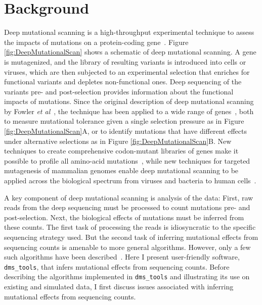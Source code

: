 \documentclass[twocolumn]{bmcart}%
\begin{document}
\section*{Background}
Deep mutational scanning is a high-throughput experimental technique to assess the impacts of mutations on a protein-coding gene~\cite{fowler2014deep}. Figure \ref{fig:DeepMutationalScan} shows a schematic of deep mutational scanning. A gene is mutagenized, and the library of resulting variants is introduced into cells or viruses, which are then subjected to an experimental selection that enriches for functional variants and depletes non-functional ones. Deep sequencing of the variants pre- and post-selection provides information about the functional impacts of mutations. Since the original description of deep mutational scanning by Fowler \textit{et al}~\cite{fowler2010high}, the technique has been applied to a wide range of genes~\cite{traxlmayr2012construction,mclaughlin2012spatial,starita2013activity,melamed2013deep,roscoe2013analyses,firnberg2014comprehensive,bloom2014experimentally,melnikov2014comprehensive,thyagarajan2014inherent,wu2014high,wu2014ns,olson2014comprehensive,kitzman2015massively}, both to measure mutational tolerance given a single selection pressure as in Figure \ref{fig:DeepMutationalScan}A, or to identify mutations that have different effects under alternative selections as in Figure \ref{fig:DeepMutationalScan}B. New techniques to create comprehensive codon-mutant libraries of genes make it possible to profile all amino-acid mutations~\cite{firnberg2012,jain2013rapid,firnberg2014comprehensive,bloom2014experimentally,melnikov2014comprehensive,kitzman2015massively}, while new techniques for targeted mutagenesis of mammalian genomes enable deep mutational scanning to be applied across the biological spectrum from viruses and bacteria to human cells~\cite{findlay2014saturation}.

A key component of deep mutational scanning is analysis of the data: First, raw reads from the deep sequencing must be processed to count mutations pre- and post-selection. Next, the biological effects of mutations must be inferred from these counts. The first task of processing the reads is idiosyncratic to the specific sequencing strategy used. But the second task of inferring mutational effects from sequencing counts is amenable to more general algorithms. However, only a few such algorithms have been described~\cite{fowler2011enrich,bank2014bayesian}. Here I present user-friendly software, \texttt{dms\_tools}, that infers mutational effects from sequencing counts. Before describing the algorithms implemented in \texttt{dms\_tools} and illustrating its use on existing and simulated data, I first discuss issues associated with inferring mutational effects from sequencing counts.
\end{document}
